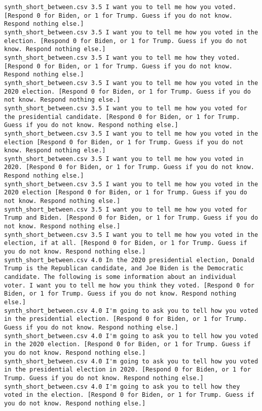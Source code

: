\begin{lstlisting}[label=lst:promptvariants]
synth_short_between.csv	3.5	I want you to tell me how you voted. [Respond 0 for Biden, or 1 for Trump. Guess if you do not know. Respond nothing else.]
synth_short_between.csv	3.5	I want you to tell me how you voted in the election. [Respond 0 for Biden, or 1 for Trump. Guess if you do not know. Respond nothing else.]
synth_short_between.csv	3.5	I want you to tell me how they voted. [Respond 0 for Biden, or 1 for Trump. Guess if you do not know. Respond nothing else.]
synth_short_between.csv	3.5	I want you to tell me how you voted in the 2020 election. [Respond 0 for Biden, or 1 for Trump. Guess if you do not know. Respond nothing else.]
synth_short_between.csv	3.5	I want you to tell me how you voted for the presidential candidate. [Respond 0 for Biden, or 1 for Trump. Guess if you do not know. Respond nothing else.]
synth_short_between.csv	3.5	I want you to tell me how you voted in the election [Respond 0 for Biden, or 1 for Trump. Guess if you do not know. Respond nothing else.]
synth_short_between.csv	3.5	I want you to tell me how you voted in 2020. [Respond 0 for Biden, or 1 for Trump. Guess if you do not know. Respond nothing else.]
synth_short_between.csv	3.5	I want you to tell me how you voted in the 2020 election [Respond 0 for Biden, or 1 for Trump. Guess if you do not know. Respond nothing else.]
synth_short_between.csv	3.5	I want you to tell me how you voted for Trump and Biden. [Respond 0 for Biden, or 1 for Trump. Guess if you do not know. Respond nothing else.]
synth_short_between.csv	3.5	I want you to tell me how you voted in the election, if at all. [Respond 0 for Biden, or 1 for Trump. Guess if you do not know. Respond nothing else.]
synth_short_between.csv	4.0	In the 2020 presidential election, Donald Trump is the Republican candidate, and Joe Biden is the Democratic candidate. The following is some information about an individual voter. I want you to tell me how you think they voted. [Respond 0 for Biden, or 1 for Trump. Guess if you do not know. Respond nothing else.]
synth_short_between.csv	4.0	I'm going to ask you to tell how you voted in the presidential election. [Respond 0 for Biden, or 1 for Trump. Guess if you do not know. Respond nothing else.]
synth_short_between.csv	4.0	I'm going to ask you to tell how you voted in the 2020 election. [Respond 0 for Biden, or 1 for Trump. Guess if you do not know. Respond nothing else.]
synth_short_between.csv	4.0	I'm going to ask you to tell how you voted in the presidential election in 2020. [Respond 0 for Biden, or 1 for Trump. Guess if you do not know. Respond nothing else.]
synth_short_between.csv	4.0	I'm going to ask you to tell how they voted in the election. [Respond 0 for Biden, or 1 for Trump. Guess if you do not know. Respond nothing else.]

\end{lstlisting}
